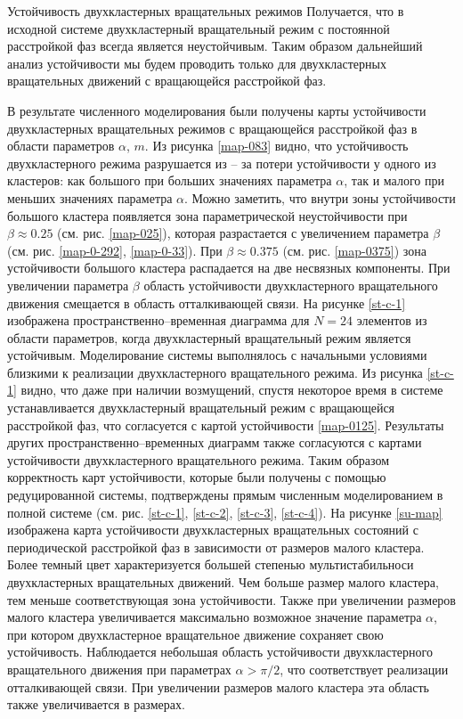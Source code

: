 \begin{chapter}{Устойчивость двухкластерных вращательных режимов}
	Получается, что в исходной системе двухкластерный вращательный режим с постоянной расстройкой фаз всегда является неустойчивым.
	Таким образом дальнейший анализ устойчивости мы будем проводить только для двухкластерных вращательных движений с вращающейся
	расстройкой фаз.


	В результате численного моделирования были получены карты устойчивости двухкластерных вращательных
	режимов с вращающейся расстройкой фаз в области параметров $\alpha$, $m$. Из рисунка \ref{map-083} видно, что устойчивость двухкластерного режима разрушается из -- за потери устойчивости у одного из кластеров:
	как большого при больших значениях параметра $\alpha$, так и малого при меньших значениях параметра $\alpha$.
	Можно заметить, что внутри зоны устойчивости большого кластера появляется зона параметрической неустойчивости при $\beta \approx 0.25$ (см. рис. \ref{map-025}), которая
	разрастается с увеличением параметра $\beta$ (см. рис. \ref{map-0-292}, \ref{map-0-33}). При $\beta \approx 0.375$ (см. рис. \ref{map-0375}) зона устойчивости большого кластера
	распадается на две несвязных компоненты. При увеличении параметра $\beta$ область устойчивости двухкластерного вращательного движения смещается в область отталкивающей связи.
	На рисунке \ref{st-c-1} изображена пространственно--временная диаграмма для $N = 24$ элементов из области параметров, когда
	двухкластерный вращательный режим является устойчивым. Моделирование системы выполнялось с начальными условиями 
	близкими к реализации двухкластерного вращательного режима. Из рисунка \ref{st-c-1} видно, что даже при наличии возмущений,
	спустя некоторое время в системе устанавливается двухкластерный вращательный режим с вращающейся расстройкой фаз, что согласуется с
	картой устойчивости \ref{map-0125}. Результаты других пространственно--временных диаграмм также согласуются с картами устойчивости двухкластерного вращательного режима.
	Таким образом корректность карт устойчивости, которые были получены с помощью редуцированной системы, подтверждены прямым численным моделированием в полной системе (см. рис. \ref{st-c-1}, \ref{st-c-2}, \ref{st-c-3}, \ref{st-c-4}).
	На рисунке \ref{su-map} изображена карта устойчивости двухкластерных вращательных состояний с
	периодической расстройкой фаз в зависимости от размеров малого кластера. Более темный цвет
	характеризуется большей степенью мультистабильноси двухкластерных вращательных движений.
	Чем больше размер малого кластера, тем меньше соответствующая
	зона устойчивости. Также при увеличении размеров малого кластера увеличивается максимально возможное значение параметра
	$\alpha$, при котором двухкластерное вращательное движение сохраняет свою устойчивость.
	Наблюдается небольшая область устойчивости двухкластерного вращательного движения при параметрах $\alpha > \pi/2$, что соответствует
	реализации отталкивающей связи. При увеличении размеров малого кластера эта область также увеличивается в размерах.


\end{chapter}
